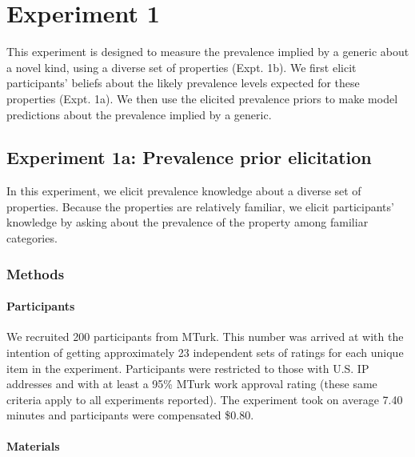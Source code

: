 \documentclass[floatsintext,doc]{apa6}
\let\oldparagraph\paragraph
\renewcommand{\paragraph}[1]{\oldparagraph{#1}\mbox{}}
\begin{document}
\hypertarget{experiment-1}{%
\section{Experiment 1}\label{experiment-1}}

This experiment is designed to measure the prevalence implied by a generic about a novel kind, using a diverse set of properties (Expt. 1b).
We first elicit participants' beliefs about the likely prevalence levels expected for these properties (Expt. 1a).
We then use the elicited prevalence priors to make model predictions about the prevalence implied by a generic.

\hypertarget{experiment-1a-prevalence-prior-elicitation}{%
\subsection{Experiment 1a: Prevalence prior elicitation}\label{experiment-1a-prevalence-prior-elicitation}}

In this experiment, we elicit prevalence knowledge about a diverse set of properties.
Because the properties are relatively familiar, we elicit participants' knowledge by asking about the prevalence of the property among familiar categories.

\hypertarget{methods}{%
\subsubsection{Methods}\label{methods}}

\hypertarget{participants-1}{%
\paragraph{Participants}\label{participants-1}}

We recruited 200 participants from MTurk.
This number was arrived at with the intention of getting approximately 23 independent sets of ratings for each unique item in the experiment.
Participants were restricted to those with U.S. IP addresses and with at least a 95\% MTurk work approval rating (these same criteria apply to all experiments reported).
The experiment took on average 7.40 minutes and participants were compensated \$0.80.

\hypertarget{materials}{%
\paragraph{Materials}\label{materials}}
\end{document}
